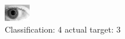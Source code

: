 \begin{figure}[h!]
\begin{center}
\includegraphics[width=0.60\columnwidth]{figures/ID333_class_4_target_3.png}
\end{center}
\caption{ Classification: 4 actual target: 3}
\label{fig:ID333_class_4_target_3}
\end{figure}
